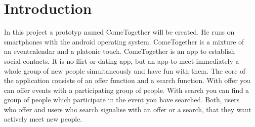 \section{Introduction}\label{sec:Introduction}
In this project a prototyp named ComeTogether will be created. He runs on smartphones with the android operating system. ComeTogether is a mixture of an eventcalendar and a platonic touch. ComeTogether is an app to establish social contacts. It is no flirt or dating app, but an app to meet immediately a whole group of new people simultaneously and have fun with them. The core of the application consists of an offer function and a search function. With offer you can offer events with a participating group of people. With search you can find a group of people which participate in the event you have searched. Both, users who offer and users who search signalise with an offer or a search, that they want actively meet new people.